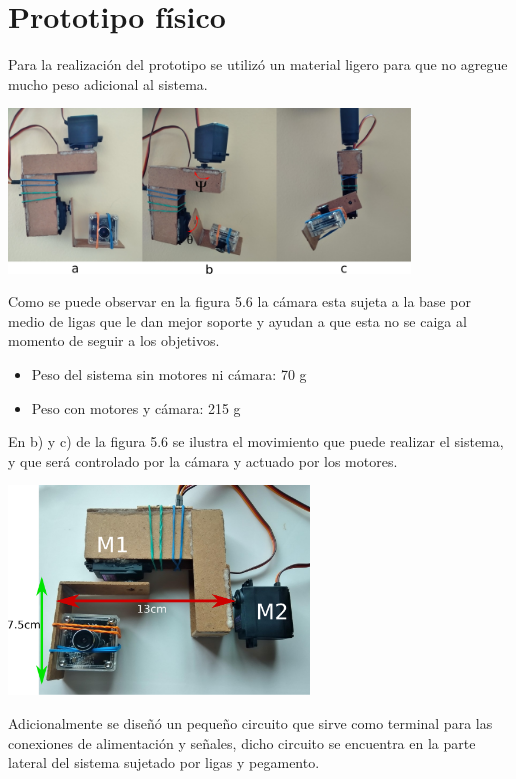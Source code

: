 \section{Prototipo físico}
Para la realización del prototipo se utilizó un material ligero para que no agregue mucho peso adicional al sistema.
\begin{center}
	\includegraphics[width=0.8\textwidth]{Contenido/Cuerpo/Capitulo5/Fig17.eps}
	\label{Fig1}
\end{center}
Como se puede observar en la figura 5.6 la cámara esta sujeta a la base por medio de ligas que le dan mejor soporte y ayudan a que
esta no se caiga al momento de seguir a los objetivos.
\begin{itemize}
    \item Peso del sistema sin motores ni cámara: 70 g
    \item Peso con motores y cámara: 215 g
\end{itemize}
En b) y c) de la figura 5.6 se ilustra el movimiento que puede realizar el sistema, y que será controlado
por la cámara y actuado por los motores.
\begin{center}
	\includegraphics[width=0.6\textwidth]{Contenido/Cuerpo/Capitulo5/Fig20.eps}
	\label{Fig4}
\end{center}
Adicionalmente se diseñó un pequeño circuito que sirve como terminal para las conexiones de alimentación y señales,
dicho circuito se encuentra en la parte lateral del sistema sujetado por ligas y pegamento.\\
